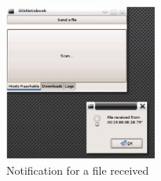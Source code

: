 \documentclass[a4paper, 12pt, final]{article}
\begin{document}
\begin{figure}[!h] %
\centering
\includegraphics[width=5cm]{4.jpg} %
\caption{Notification for a file received} %
\label{api} %
\end{figure} %
 
\end{document}
